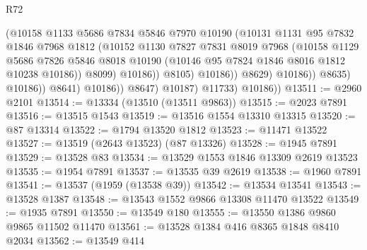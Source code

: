 \begin{lexlean}{R72}
\begin{coremodule}
                                      (@10158
                                        @1133
                                        @5686
                                        @7834
                                        @5846
                                        @7970
                                        @10190
                                        (@10131
                                          @1131
                                          @95
                                          @7832
                                          @1846
                                          @7968
                                          @1812
                                          (@10152
                                            @1130
                                            @7827
                                            @7831
                                            @8019
                                            @7968
                                            (@10158
                                              @1129
                                              @5686
                                              @7826
                                              @5846
                                              @8018
                                              @10190
                                              (@10146 @95 @7824 @1846 @8016 @1812 @10238 @10186))
                                            @8099)
                                          @10186))
                                      @8105)
                                    @10186))
                                @8629)
                              @10186))
                          @8635)
                        @10186))
                    @8641)
                  @10186))
              @8647)
            @10187)
          @11733)
        @10186))
@13511 := @2960 @2101
@13514 := @13334 (@13510 (@13511 @9863))
@13515 := @2023 @7891
@13516 := @13515 @1543
@13519 := @13516 @1554 @13310 @13315
@13520 := @87 @13314
@13522 := @1794 @13520 @1812
@13523 := @11471 @13522
@13527 := @13519 (@2643 @13523) (@87 @13326)
@13528 := @1945 @7891
@13529 := @13528 @83
@13534 := @13529 @1553 @1846 @13309 @2619 @13523
@13535 := @1954 @7891
@13537 := @13535 @39 @2619
@13538 := @1960 @7891
@13541 := @13537 (@1959 (@13538 @39))
@13542 := @13534 @13541
@13543 := @13528 @1387
@13548 := @13543 @1552 @9866 @13308 @11470 @13522
@13549 := @1935 @7891
@13550 := @13549 @180
@13555 := @13550 @1386 @9860 @9865 @11502 @11470
@13561 := @13528 @1384 @416 @8365 @1848 @8410 @2034
@13562 := @13549 @414

\end{coremodule}
\end{lexlean}
